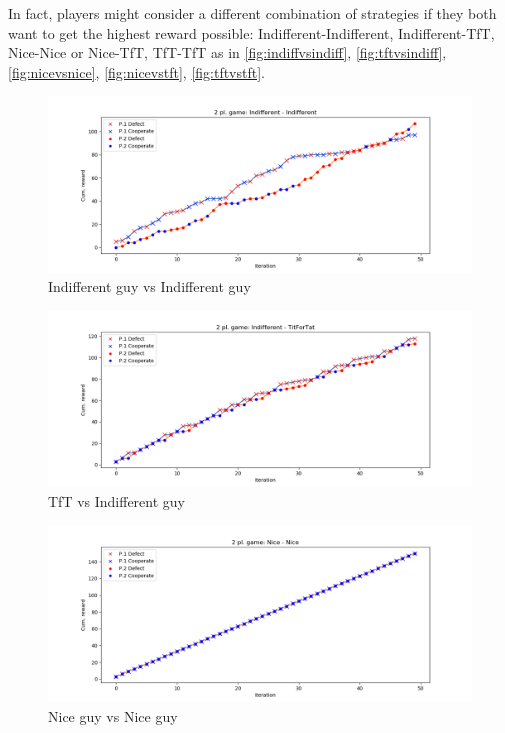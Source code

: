 \documentclass[journal,a4paper,10pt,twoside]{IEEEtran}
\begin{document}
In fact, players might consider a different combination of strategies if they both want to get the highest reward possible: Indifferent-Indifferent, Indifferent-TfT, Nice-Nice or Nice-TfT, TfT-TfT as in \autoref{fig:indiffvsindiff}, \autoref{fig:tftvsindiff}, \autoref{fig:nicevsnice}, \autoref{fig:nicevstft}, \autoref{fig:tftvstft}.

\begin{figure}[ht]
    \centering
    \includegraphics[width=1\columnwidth]{../img_v1/idp2p-rewards-Indifferent-Indifferent.png}
    \caption{Indifferent guy vs Indifferent guy}
    \label{fig:indiffvsindiff}
\end{figure}

\begin{figure}[ht]
    \centering
    \includegraphics[width=1\columnwidth]{../img_v1/idp2p-rewards-Indifferent-TitForTat.png}
    \caption{TfT vs Indifferent guy}
    \label{fig:tftvsindiff}
\end{figure}

\begin{figure}[ht]
    \centering
    \includegraphics[width=1\columnwidth]{../img_v1/idp2p-rewards-Nice-Nice.png}
    \caption{Nice guy vs Nice guy}
    \label{fig:nicevsnice}
\end{figure}
\end{document}
